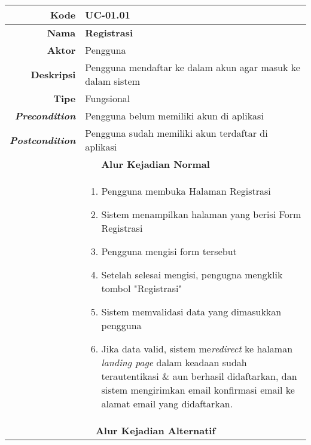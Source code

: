 \begin{table}[H]
	\centering
\begin{tabular}{|r|p{8cm}|}
		\hline
		\textbf{Kode}                                                    & UC-01.01                                                     \\ \hline
		\textbf{Nama}                                                    & \textbf{Registrasi}                                         \\ \hline
		\textbf{Aktor}                                                   & Pengguna                                                    \\ \hline
		\textbf{Deskripsi}                                               & Pengguna mendaftar ke dalam akun agar masuk ke dalam sistem \\ \hline
		\textbf{Tipe}                                                    & Fungsional                                                  \\ \hline
		\textbf{\textit{Precondition}}
			& Pengguna belum memiliki akun di aplikasi                    \\ \hline
		\textbf{\textit{Postcondition}} 
			& Pengguna sudah memiliki akun terdaftar di aplikasi          \\ \hline
		\multicolumn{2}{|c|}{\textbf{Alur Kejadian Normal}}                                                                            \\ \hline
		\multicolumn{1}{|l|}{}                                           & 
			\begin{enumerate}
				\item Pengguna membuka Halaman Registrasi
				\item \label{uc0101-show1page}Sistem menampilkan halaman yang berisi Form Registrasi
				\item Pengguna mengisi form tersebut
				\item Setelah selesai mengisi, pengugna mengklik tombol "Registrasi"
				\item \label{al-0101-a} Sistem memvalidasi data yang dimasukkan pengguna
				\item Jika data valid, sistem me\textit{redirect} ke halaman \textit{landing page} dalam keadaan sudah terautentikasi \& aun berhasil didaftarkan, dan sistem mengirimkan email konfirmasi email ke alamat email yang didaftarkan.
			\end{enumerate}
		\\ \hline
		\multicolumn{2}{|c|}{\textbf{Alur Kejadian Alternatif}}                                                         \\ \hline

\end{tabular}
\end{table}
